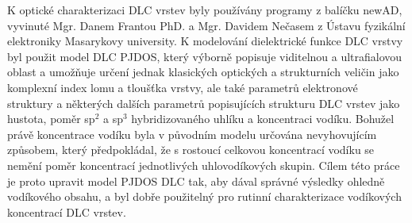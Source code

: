 K optické charakterizaci DLC vrstev byly používány programy z balíčku newAD, vy\-vinuté Mgr. Danem Frantou PhD. a Mgr. Davidem Nečasem z Ústavu fyzikální elektroniky Masarykovy university. K modelování dielektrické funkce DLC vrstvy byl použit model DLC PJDOS, který výborně popisuje viditelnou a ultrafialovou oblast a umožňuje určení jednak klasic\-kých optických a strukturních veličin jako komplexní index lomu a tloušťka vrstvy, ale také parametrů elektronové struktury a některých dalších parametrů popisujících strukturu DLC vrstev jako hustota, poměr sp$^2$ a sp$^3$ hybridizovaného uhlíku a koncentraci vodíku. 
Bohužel právě koncentrace vodíku byla v původním modelu určována nevyhovujícím způsobem, který předpokládal, že s rostoucí celkovou koncentrací vodíku se nemění poměr koncentrací jednotlivých uhlovodíkových skupin. Cílem této práce je proto upravit model PJDOS DLC tak, aby dával správné výsledky ohledně vodíkového obsahu, a byl dobře použitelný pro rutinní charakterizace vodíkových koncentrací DLC vrstev.
 
\cleardoublepage

